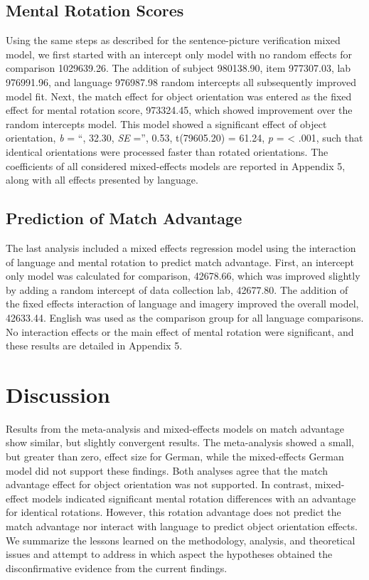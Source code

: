 \documentclass[
  man]{apa7}
\begin{document}
\hypertarget{mental-rotation-scores}{%
\subsection{Mental Rotation Scores}\label{mental-rotation-scores}}

Using the same steps as described for the sentence-picture verification mixed model, we first started with an intercept only model with no random effects for comparison 1029639.26. The addition of subject 980138.90, item 977307.03, lab 976991.96, and language 976987.98 random intercepts all subsequently improved model fit. Next, the match effect for object orientation was entered as the fixed effect for mental rotation score, 973324.45, which showed improvement over the random intercepts model. This model showed a significant effect of object orientation, \emph{b} = ``, 32.30, \emph{SE} ='', 0.53, t(79605.20) = 61.24, \emph{p} = \textless{} .001, such that identical orientations were processed faster than rotated orientations. The coefficients of all considered mixed-effects models are reported in Appendix 5, along with all effects presented by language.

\hypertarget{prediction-of-match-advantage}{%
\subsection{Prediction of Match Advantage}\label{prediction-of-match-advantage}}

The last analysis included a mixed effects regression model using the interaction of language and mental rotation to predict match advantage. First, an intercept only model was calculated for comparison, 42678.66, which was improved slightly by adding a random intercept of data collection lab, 42677.80. The addition of the fixed effects interaction of language and imagery improved the overall model, 42633.44. English was used as the comparison group for all language comparisons. No interaction effects or the main effect of mental rotation were significant, and these results are detailed in Appendix 5.

\hypertarget{discussion}{%
\section{Discussion}\label{discussion}}

Results from the meta-analysis and mixed-effects models on match advantage show similar, but slightly convergent results. The meta-analysis showed a small, but greater than zero, effect size for German, while the mixed-effects German model did not support these findings. Both analyses agree that the match advantage effect for object orientation was not supported. In contrast, mixed-effect models indicated significant mental rotation differences with an advantage for identical rotations. However, this rotation advantage does not predict the match advantage nor interact with language to predict object orientation effects. We summarize the lessons learned on the methodology, analysis, and theoretical issues and attempt to address in which aspect the hypotheses obtained the disconfirmative evidence from the current findings.
\end{document}

